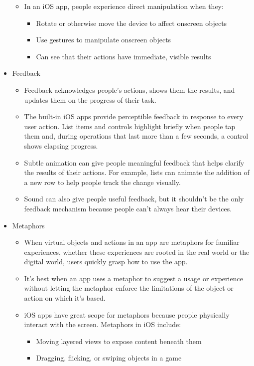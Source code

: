 \begin{itemize}
\begin{itemize}
	\newpage
	\item In an iOS app, people experience direct manipulation when they: 
		\begin{itemize}
		\item Rotate or otherwise move the device to affect onscreen objects 
		\item Use gestures to manipulate onscreen objects 
		\item Can see that their actions have immediate, visible results 
		\end{itemize}
	\end{itemize}
\item Feedback
	\begin{itemize}
	\item Feedback acknowledges people's actions, shows them the results, and updates them on the progress of their task. 
	\item  The built-in iOS apps provide perceptible feedback in response to every user action. List items and controls highlight briefly when people tap them and, during operations that last more than a few seconds, a control shows elapsing progress.
	\item Subtle animation can give people meaningful feedback that helps clarify the results of their actions. For example, lists can animate the addition of a new row to help people track the change visually.
	\item Sound can also give people useful feedback, but it shouldn't be the only feedback mechanism because people can't always hear their devices. 
	\end{itemize}
\item Metaphors
	\begin{itemize}
	\item  When virtual objects and actions in an app are metaphors for familiar experiences, whether these experiences are rooted in the real world or the digital world, users quickly grasp how to use the app.
	\item It's best when an app uses a metaphor to suggest a usage or experience without letting the metaphor enforce the limitations of the object or action on which it's based.
	\item iOS apps have great scope for metaphors because people physically interact with the screen. Metaphors in iOS include: 
		\begin{itemize}
		\item Moving layered views to expose content beneath them
		\item Dragging, flicking, or swiping objects in a game

\end{itemize}
\end{itemize}
\end{itemize}
